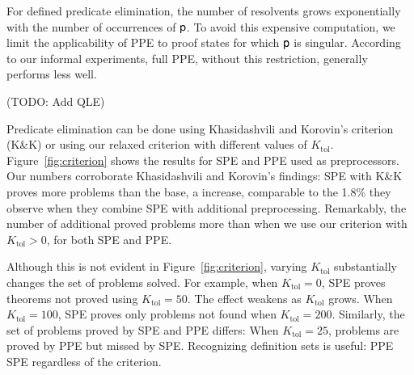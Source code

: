 %
For defined predicate elimination, the number of resolvents grows
exponentially with the number of occurrences of $\mathsf{p}$. To avoid this expensive
computation, we limit the applicability of PPE to proof states for which $\mathsf{p}$
is singular. According to our informal experiments, full PPE,
without this restriction, generally performs less well.

\begin{qle}\color{red} (TODO: Add QLE)\color{black}\end{qle}

Predicate elimination can be done using Khasidashvili and Korovin's
criterion (K\&K) or using our relaxed criterion with different values of
$K_\mathrm{tol}$. Figure~\ref{fig:criterion} shows the results
for SPE and PPE used as preprocessors.
Our numbers corroborate Khasidashvili and Korovin's findings:
SPE with K\&K proves  more problems than the base, a
 increase, comparable to the 1.8\% they observe when
they combine SPE with additional preprocessing.
Remarkably, the number of additional proved problems more than
 when we use our criterion with $K_\mathrm{tol} > 0$, for both SPE and PPE.

Although this is not evident in Figure~\ref{fig:criterion}, varying
$K_\mathrm{tol}$ substantially changes the set of problems solved. For example,
when $K_\mathrm{tol}=0$, SPE proves  theorems not proved using
$K_\mathrm{tol}=50$. The effect weakens as $K_\mathrm{tol}$ grows. When
$K_\mathrm{tol}=100$, SPE proves only  problems not found when
$K_\mathrm{tol}=200$. Similarly, the set of problems proved by SPE and PPE
differs: When $K_\mathrm{tol}=25$,  problems are proved by PPE but
missed by SPE. Recognizing definition sets is useful:
PPE  SPE regardless of the criterion.


